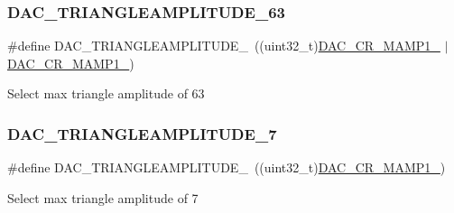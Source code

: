 \subsubsection{\texorpdfstring{DAC\_TRIANGLEAMPLITUDE\_63}{DAC\_TRIANGLEAMPLITUDE\_63}}
{\footnotesize\ttfamily \#define D\+A\+C\+\_\+\+T\+R\+I\+A\+N\+G\+L\+E\+A\+M\+P\+L\+I\+T\+U\+D\+E\+\_~((uint32\+\_\+t)\mbox{\hyperlink{group___peripheral___registers___bits___definition_ga0fefef1d798a2685b03e44bd9fdac06b}{D\+A\+C\+\_\+\+C\+R\+\_\+\+M\+A\+M\+P1\+\_}} $\vert$ \mbox{\hyperlink{group___peripheral___registers___bits___definition_ga4225dcce22b440fcd3a8ad96c5f2baec}{D\+A\+C\+\_\+\+C\+R\+\_\+\+M\+A\+M\+P1\+\_}})}

Select max triangle amplitude of 63 \mbox{\label{group___d_a_c_ex__lfsrunmask__triangleamplitude_ga27c799055d0d9ddc50b73223ab5563d2}} 
\subsubsection{\texorpdfstring{DAC\_TRIANGLEAMPLITUDE\_7}{DAC\_TRIANGLEAMPLITUDE\_7}}
{\footnotesize\ttfamily \#define D\+A\+C\+\_\+\+T\+R\+I\+A\+N\+G\+L\+E\+A\+M\+P\+L\+I\+T\+U\+D\+E\+\_~((uint32\+\_\+t)\mbox{\hyperlink{group___peripheral___registers___bits___definition_ga6cc15817842cb7992d449c448684f68d}{D\+A\+C\+\_\+\+C\+R\+\_\+\+M\+A\+M\+P1\+\_}})}

Select max triangle amplitude of 7 